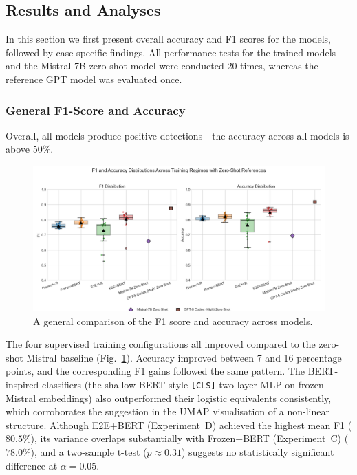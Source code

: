 \documentclass[12pt]{article}
\begin{document}
\subsection{Results and Analyses}
In this section we first present overall accuracy and F1 scores for the models, followed by case-specific findings. All performance tests for the trained models and the Mistral 7B zero-shot model were conducted 20 times, whereas the reference GPT model was evaluated once.

\subsubsection{General F1-Score and Accuracy}

Overall, all models produce positive detections\;---\;the accuracy across all models is above 50\%.

\begin{figure}[htbp]
  \centering
  \includegraphics[width=1\textwidth]{figures/Accuracy_distribution_4settings.png}
  \caption{A general comparison of the F1 score and accuracy across models.}
  \label{fig:total-comparison}
\end{figure}

The four supervised training configurations all improved compared to the zero-shot Mistral baseline (Fig.~\ref{fig:total-comparison}). Accuracy improved between 7 and 16 percentage points, and the corresponding F1 gains followed the same pattern. The BERT-inspired classifiers (the shallow BERT-style \texttt{[CLS]} two-layer MLP on frozen Mistral embeddings) also outperformed their logistic equivalents consistently, which corroborates the suggestion in the UMAP visualisation of a non-linear structure. Although E2E+BERT (Experiment~D) achieved the highest mean F1 (\(80.5\%\)), its variance overlaps substantially with Frozen+BERT (Experiment~C) (\(78.0\%\)), and a two-sample t-test (\(p \approx 0.31\)) suggests no statistically significant difference at \(\alpha = 0.05\).
\end{document}

